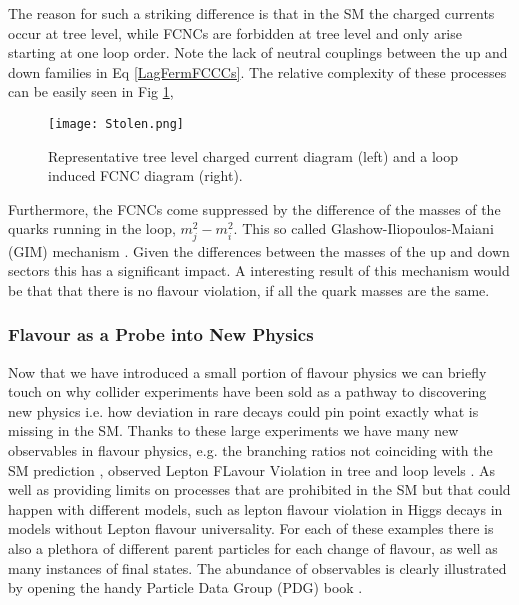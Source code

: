 \setlength{\tabcolsep}{6pt} %
\renewcommand{\arraystretch}{1} %

The reason for such a striking difference is that in the SM the charged currents occur at tree level, while FCNCs are forbidden at tree level and only arise starting at one loop order. Note the lack of neutral couplings between the up and down families in Eq \ref{LagFermFCCCs}. The relative complexity of these processes can be easily seen in Fig \ref{fig:Flavour_D_1},
%
\begin{figure}[H]
	\centering
	\texttt{[image: Stolen.png]}
	\caption{Representative tree level charged current diagram (left) and a loop induced FCNC diagram (right).}
	\label{fig:Flavour_D_1}
\end{figure}
%
%
Furthermore, the FCNCs come suppressed by the difference of the masses of the quarks running in the loop, $m^2_j-m^2_i$. This so called Glashow-Iliopoulos-Maiani (GIM) mechanism \cite{glashow1970weak}. Given the differences between the masses of the up and down sectors this has a significant impact. 
%
A interesting result of this mechanism would be that that there is no flavour violation, if all the quark masses are the same.

\subsubsection{Flavour as a Probe into New Physics}

Now that we have introduced a small portion of flavour physics we can briefly touch on why collider experiments have been sold as a pathway to discovering new physics i.e. how deviation in rare decays could pin point exactly what is missing in the SM. 
%
Thanks to these large experiments we have many new observables in flavour physics, e.g. the branching ratios not coinciding with the SM prediction \cite{CasteloBranco2014}, observed Lepton FLavour Violation in tree and loop levels \cite{Graverini2019}. As well as providing limits on processes that are prohibited in the SM but that could happen with different models, such as lepton flavour violation in Higgs decays \cite{Sirunyan_2018} in models without Lepton flavour universality.  For each of these examples there is also a plethora of different parent particles for each change of flavour, as well as many instances of final states. 
%
The abundance of observables is clearly illustrated by opening the handy Particle Data Group (PDG) book \cite{Tanabashi2018}. 

